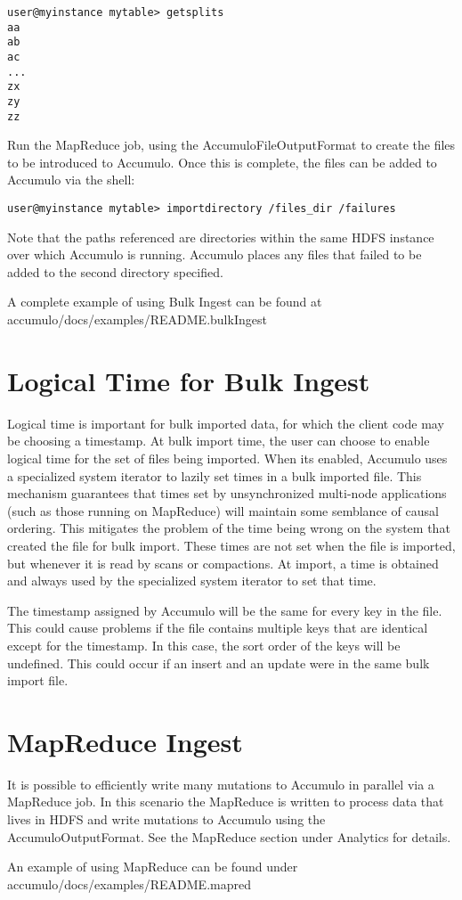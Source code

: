 \small
\begin{verbatim}
user@myinstance mytable> getsplits
aa
ab
ac
...
zx
zy
zz
\end{verbatim}
\normalsize

Run the MapReduce job, using the AccumuloFileOutputFormat to create the files to
be introduced to Accumulo. Once this is complete, the files can be added to
Accumulo via the shell:

\small
\begin{verbatim}
user@myinstance mytable> importdirectory /files_dir /failures
\end{verbatim}
\normalsize

Note that the paths referenced are directories within the same HDFS instance over
which Accumulo is running. Accumulo places any files that failed to be added to the
second directory specified.

A complete example of using Bulk Ingest can be found at\\
accumulo/docs/examples/README.bulkIngest

\section{Logical Time for Bulk Ingest}

Logical time is important for bulk imported data, for which the client code may
be choosing a timestamp. At bulk import time, the user can choose to enable
logical time for the set of files being imported. When its enabled, Accumulo
uses a specialized system iterator to lazily set times in a bulk imported file.
This mechanism guarantees that times set by unsynchronized multi-node
applications (such as those running on MapReduce) will maintain some semblance
of causal ordering. This mitigates the problem of the time being wrong on the
system that created the file for bulk import. These times are not set when the
file is imported, but whenever it is read by scans or compactions. At import, a
time is obtained and always used by the specialized system iterator to set that
time.

The timestamp assigned by Accumulo will be the same for every key in the file.
This could cause problems if the file contains multiple keys that are identical
except for the timestamp. In this case, the sort order of the keys will be
undefined. This could occur if an insert and an update were in the same bulk
import file.

\section{MapReduce Ingest}
It is possible to efficiently write many mutations to Accumulo in parallel via a
MapReduce job. In this scenario the MapReduce is written to process data that lives
in HDFS and write mutations to Accumulo using the AccumuloOutputFormat. See
the MapReduce section under Analytics for details.

An example of using MapReduce can be found under\\
accumulo/docs/examples/README.mapred

